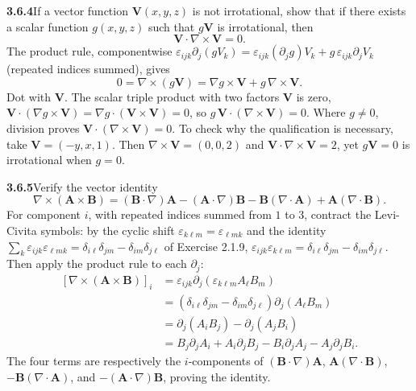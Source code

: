 \par\bigskip
\noindent\textbf{3.6.4}\quad If a vector function $\mathbf{V}(x,y,z)$ is not
irrotational, show that if there exists a  scalar function $g(x,y,z)$ such that
$g\mathbf{V}$ is irrotational, then
\[
\mathbf{V}\cdot\nabla\times\mathbf{V}=0.
\]
\solution
{}
The product rule, componentwise
$\varepsilon_{ijk}\partial_j(gV_k)=\varepsilon_{ijk}(\partial_jg)V_k
+g\,\varepsilon_{ijk}\partial_jV_k$ (repeated indices summed), gives
\[
0=\nabla\times(g\mathbf V)=\nabla g\times\mathbf V
+g\,\nabla\times\mathbf V.
\]
Dot with $\mathbf V$. The scalar triple product with two factors
$\mathbf V$ is zero,
$\mathbf V\cdot(\nabla g\times\mathbf V)
=\nabla g\cdot(\mathbf V\times\mathbf V)=0$, so
$g\,\mathbf V\cdot(\nabla\times\mathbf V)=0$.
Where $g\ne0$, division proves
$\boxed{\mathbf V\cdot(\nabla\times\mathbf V)=0}$.
To check why the qualification is necessary, take
$\mathbf V=(-y,x,1)$. Then $\nabla\times\mathbf V=(0,0,2)$ and
$\mathbf V\cdot\nabla\times\mathbf V=2$, yet $g\mathbf V=0$ is
irrotational when $g=0$.

\par\bigskip
\noindent\textbf{3.6.5}\quad Verify the vector identity
\[
\nabla\times(\mathbf{A}\times\mathbf{B})
=(\mathbf{B}\cdot\nabla)\mathbf{A}-(\mathbf{A}\cdot\nabla)\mathbf{B}
-\mathbf{B}(\nabla\cdot\mathbf{A})+\mathbf{A}(\nabla\cdot\mathbf{B}).
\]
\solution
For component $i$, with repeated indices summed from $1$ to $3$,
contract the Levi-Civita symbols: by the cyclic shift
$\varepsilon_{k\ell m}=\varepsilon_{\ell mk}$ and the identity
$\sum_k\varepsilon_{ijk}\varepsilon_{\ell mk}
=\delta_{i\ell}\delta_{jm}-\delta_{im}\delta_{j\ell}$ of Exercise 2.1.9,
$\varepsilon_{ijk}\varepsilon_{k\ell m}
=\delta_{i\ell}\delta_{jm}-\delta_{im}\delta_{j\ell}$.
Then apply the product rule to each $\partial_j$:
\[
\begin{aligned}
{}[\nabla\times(\mathbf A\times\mathbf B)]_i
&=\varepsilon_{ijk}\partial_j(\varepsilon_{k\ell m}A_\ell B_m)\\
&=(\delta_{i\ell}\delta_{jm}-\delta_{im}\delta_{j\ell})
\partial_j(A_\ell B_m)\\
&=\partial_j(A_iB_j)-\partial_j(A_jB_i)\\
&=B_j\partial_jA_i+A_i\partial_jB_j
-B_i\partial_jA_j-A_j\partial_jB_i.
\end{aligned}
\]
The four terms are respectively the $i$-components of
$(\mathbf B\cdot\nabla)\mathbf A$,
$\mathbf A(\nabla\cdot\mathbf B)$,
$-\mathbf B(\nabla\cdot\mathbf A)$, and
$-(\mathbf A\cdot\nabla)\mathbf B$, proving the identity.

